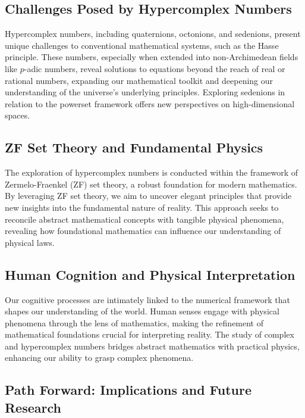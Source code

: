 \documentclass[12pt]{article}
\begin{document}
\subsection{Challenges Posed by Hypercomplex Numbers}

Hypercomplex numbers, including quaternions, octonions, and sedenions, present unique challenges to conventional mathematical systems, such as the Hasse principle. These numbers, especially when extended into non-Archimedean fields like \(p\)-adic numbers, reveal solutions to equations beyond the reach of real or rational numbers, expanding our mathematical toolkit and deepening our understanding of the universe’s underlying principles. Exploring sedenions in relation to the powerset framework offers new perspectives on high-dimensional spaces.

\subsection{ZF Set Theory and Fundamental Physics}

The exploration of hypercomplex numbers is conducted within the framework of Zermelo-Fraenkel (ZF) set theory, a robust foundation for modern mathematics. By leveraging ZF set theory, we aim to uncover elegant principles that provide new insights into the fundamental nature of reality. This approach seeks to reconcile abstract mathematical concepts with tangible physical phenomena, revealing how foundational mathematics can influence our understanding of physical laws.

\subsection{Human Cognition and Physical Interpretation}

Our cognitive processes are intimately linked to the numerical framework that shapes our understanding of the world. Human senses engage with physical phenomena through the lens of mathematics, making the refinement of mathematical foundations crucial for interpreting reality. The study of complex and hypercomplex numbers bridges abstract mathematics with practical physics, enhancing our ability to grasp complex phenomena.

\subsection{Path Forward: Implications and Future Research}
\end{document}

